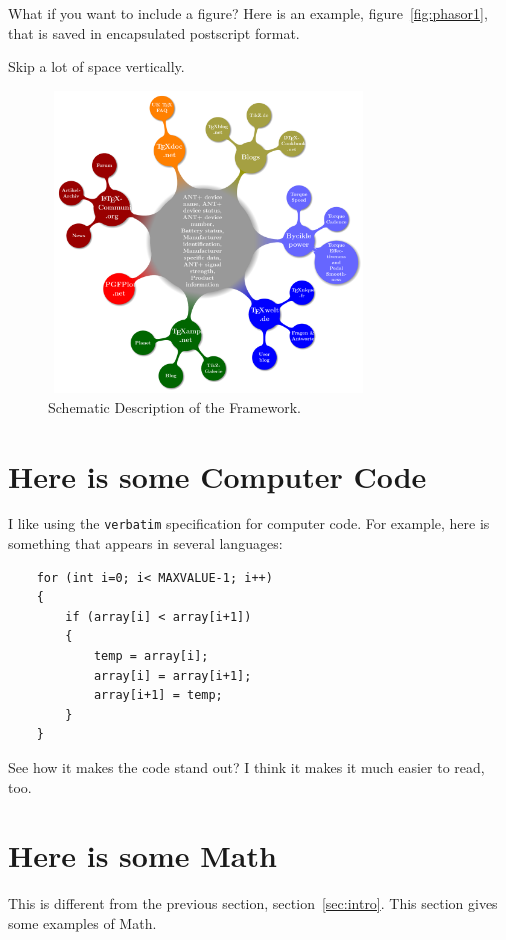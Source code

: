 \documentclass[conference]{IEEEconf}
\begin{document}
What if you want to include a figure? 
Here is an example, figure~\ref{fig:phasor1}, that is saved in 
encapsulated postscript format.




Skip a lot of space  \bigskip  vertically.
\begin{figure}[h]
\centering\includegraphics[width=8.50cm, height=8cm]{AntPlusProfiles}
\caption{\label{FRA}Schematic Description of the Framework.}

\end{figure}
\section{Here is some Computer Code}\label{sec:code}

I like using the \verb"verbatim" specification for computer code. 
For example, here is something that appears in several
languages:

\begin{verbatim}
    for (int i=0; i< MAXVALUE-1; i++)
    {
        if (array[i] < array[i+1]) 
        {
            temp = array[i];
            array[i] = array[i+1];
            array[i+1] = temp;
        }
    }
\end{verbatim}

See how it makes the code stand out? I think it makes it
much easier to read, too.

\section{Here is some Math}\label{sec:math}
This is different from the previous section, section~\ref{sec:intro}.
This section gives some examples of Math.
\end{document}
